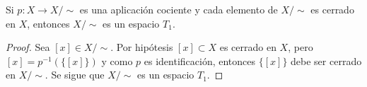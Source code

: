 
\begin{theorem}
Si $p : X \longrightarrow X/\sim$ es una aplicación cociente y cada elemento de $X/\sim$ es cerrado en $X$, entonces $X/\sim$ es un espacio $T_1$.
\end{theorem}

\begin{proof}
Sea $[x] \in X/\sim$. Por hipótesis $[x] \subset X$ es cerrado en $X$, pero $[x] = p^{-1}(\{ [x] \})$ y como $p$ es identificación, entonces $\{ [x] \}$ debe ser cerrado en $X/\sim$. Se sigue que $X/\sim$ es un espacio $T_1$.
\end{proof}
